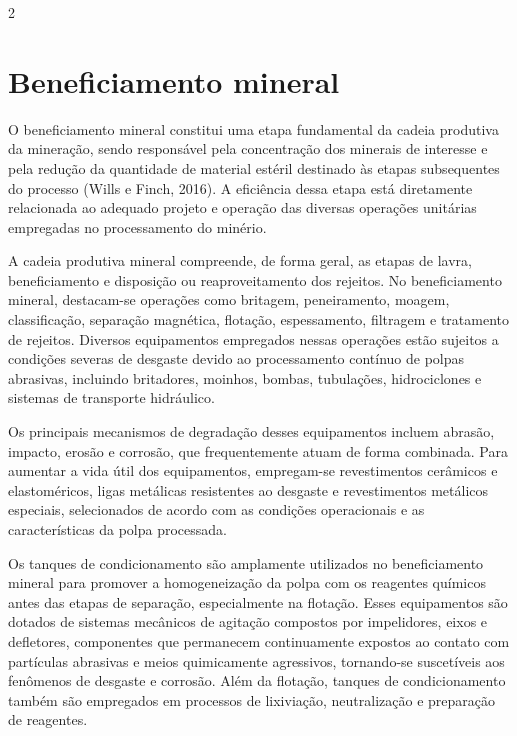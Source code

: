 \documentclass[a4paper,12pt,fleqn]{article}
\begin{document}
	\begin{multicols}{2}

		\section{Beneficiamento mineral}

			O beneficiamento mineral constitui uma etapa fundamental da cadeia produtiva da mineração, sendo responsável pela concentração dos minerais de interesse e pela redução da quantidade de material estéril destinado às etapas subsequentes do processo  (Wills e Finch, 2016). A eficiência dessa etapa está diretamente relacionada ao adequado projeto e operação das diversas operações unitárias empregadas no processamento do minério.

			A cadeia produtiva mineral compreende, de forma geral, as etapas de lavra, beneficiamento e disposição ou reaproveitamento dos rejeitos. No beneficiamento mineral, destacam-se operações como britagem, peneiramento, moagem, classificação, separação magnética, flotação, espessamento, filtragem e tratamento de rejeitos. Diversos equipamentos empregados nessas operações estão sujeitos a condições severas de desgaste devido ao processamento contínuo de polpas abrasivas, incluindo britadores, moinhos, bombas, tubulações, hidrociclones e sistemas de transporte hidráulico.

			Os principais mecanismos de degradação desses equipamentos incluem abrasão, impacto, erosão e corrosão, que frequentemente atuam de forma combinada. Para aumentar a vida útil dos equipamentos, empregam-se revestimentos cerâmicos e elastoméricos, ligas metálicas resistentes ao desgaste e revestimentos metálicos especiais, selecionados de acordo com as condições operacionais e as características da polpa processada.

			Os tanques de condicionamento são amplamente utilizados no beneficiamento mineral para promover a homogeneização da polpa com os reagentes químicos antes das etapas de separação, especialmente na flotação. Esses equipamentos são dotados de sistemas mecânicos de agitação compostos por impelidores, eixos e defletores, componentes que permanecem continuamente expostos ao contato com partículas abrasivas e meios quimicamente agressivos, tornando-se suscetíveis aos fenômenos de desgaste e corrosão. Além da flotação, tanques de condicionamento também são empregados em processos de lixiviação, neutralização e preparação de reagentes.


\end{multicols}
\end{document}
